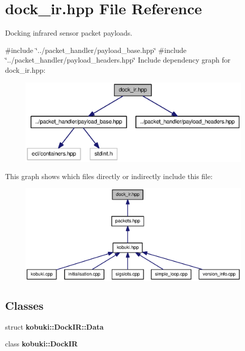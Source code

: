 \section{dock\-\_\-ir.\-hpp \-File \-Reference}
\label{dock__ir_8hpp}


\-Docking infrared sensor packet payloads.  


{\ttfamily \#include \char`\"{}../packet\-\_\-handler/payload\-\_\-base.\-hpp\char`\"{}}\*
{\ttfamily \#include \char`\"{}../packet\-\_\-handler/payload\-\_\-headers.\-hpp\char`\"{}}\*
\-Include dependency graph for dock\-\_\-ir.\-hpp\-:
\nopagebreak
\begin{figure}[H]
\begin{center}
\leavevmode
\includegraphics[width=350pt]{dock__ir_8hpp__incl}
\end{center}
\end{figure}
\-This graph shows which files directly or indirectly include this file\-:
\nopagebreak
\begin{figure}[H]
\begin{center}
\leavevmode
\includegraphics[width=350pt]{dock__ir_8hpp__dep__incl}
\end{center}
\end{figure}
\subsection*{\-Classes}
\begin{DoxyCompactItemize}
\item 
struct {\bf kobuki\-::\-Dock\-I\-R\-::\-Data}
\item 
class {\bf kobuki\-::\-Dock\-I\-R}
\end{DoxyCompactItemize}
